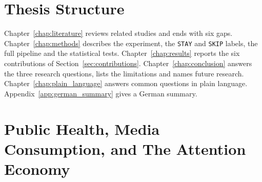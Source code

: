 \documentclass[12pt,a4paper]{report}
\begin{document}
\section{Thesis Structure}

Chapter~\ref{chap:literature} reviews related studies and ends with six gaps. Chapter~\ref{chap:methods} describes the experiment, the \texttt{STAY} and \texttt{SKIP} labels, the full pipeline and the statistical tests. Chapter~\ref{chap:results} reports the six contributions of Section~\ref{sec:contributions}. Chapter~\ref{chap:conclusion} answers the three research questions, lists the limitations and names future research. Chapter~\ref{chap:plain_language} answers common questions in plain language. Appendix~\ref{app:german_summary} gives a German summary.


\iffalse
\section{Public Health, Media Consumption, and The Attention Economy}
\end{document}
